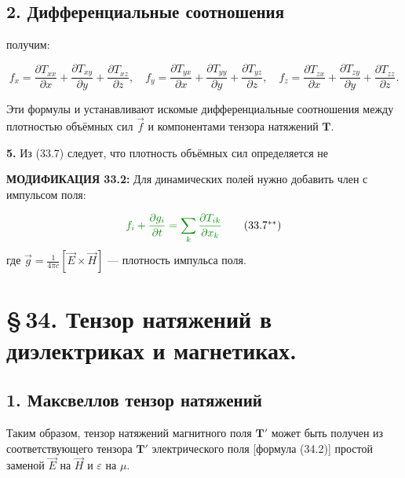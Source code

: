 \documentclass[a4paper,12pt]{article}
\newcommand{\modtext}[1]{\textcolor{modcolor}{#1}}
\newcommand{\modmath}[1]{\textcolor{modcolor}{#1}}
\newcommand{\modblock}[1]{\colorbox{modcolor!10}{\parbox{\dimexpr\linewidth-2\fboxsep}{#1}}}
\begin{document}
\subsection*{2. Дифференциальные соотношения}

\noindent
получим:

\begin{equation}
f_x = \frac{\partial T_{xx}}{\partial x} +
\frac{\partial T_{xy}}{\partial y} +
\frac{\partial T_{xz}}{\partial z},
\quad
f_y = \frac{\partial T_{yx}}{\partial x} +
\frac{\partial T_{yy}}{\partial y} +
\frac{\partial T_{yz}}{\partial z},
\quad
f_z = \frac{\partial T_{zx}}{\partial x} +
\frac{\partial T_{zy}}{\partial y} +
\frac{\partial T_{zz}}{\partial z}.
\tag{33.7}
\end{equation}

Эти формулы и устанавливают искомые дифференциальные соотношения между
плотностью объёмных сил $\vec{f}$ и компонентами тензора натяжений
$\mathbf{T}$.

\textbf{5.} Из (33.7) следует, что плотность объёмных сил определяется не

\modtext{
\textbf{МОДИФИКАЦИЯ 33.2:} Для динамических полей нужно добавить член с
импульсом поля:
}

\modblock{
\modtext{
\begin{equation}
\modmath{
f_i + \frac{\partial g_i}{\partial t} = \sum_k \frac{\partial T_{ik}}{\partial x_k}
}
\tag{33.7$^{**}$}
\end{equation}
где $\vec{g} = \frac{1}{4\pi c}[\vec{E}\times\vec{H}]$ — плотность импульса поля.
}
}


\section*{\S\,34. Тензор натяжений в диэлектриках и магнетиках.}

\subsection*{1. Максвеллов тензор натяжений}

\noindent
Таким образом, тензор натяжений магнитного поля $\mathbf{T}'$ может быть
получен из соответствующего тензора $\mathbf{T}'$ электрического поля
[формула (34.2)] простой заменой $\vec{E}$ на $\vec{H}$ и
$\varepsilon$ на $\mu$.
\end{document}
